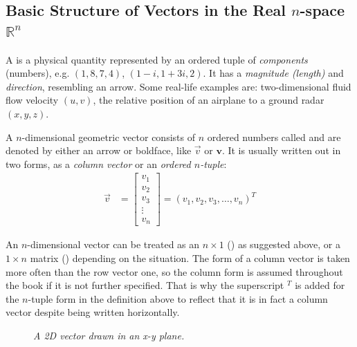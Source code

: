 \subsection{Basic Structure of Vectors in the Real $n$-space $\mathbb{R}^n$}
A  is a physical quantity represented by an ordered tuple of \textit{components} (numbers), e.g. $(1, 8, 7, 4)$, $(1-i, 1+3i, 2)$. It has a \textit{magnitude (length)} and \textit{direction}, resembling an arrow. Some real-life examples are: two-dimensional fluid flow velocity $(u, v)$, the relative position of an airplane to a ground radar $(x, y, z)$.
\begin{defn}
\label{defn:geometvec}
A $n$-dimensional geometric vector consists of $n$ ordered numbers called  and are denoted by either an arrow or boldface, like $\vec{v}$ or $\textbf{v}$. It is usually written out in two forms, as a \textit{column vector} or an \textit{ordered $n$-tuple}:
\begin{align}
\vec{v} &=
\begin{bmatrix}
v_1 \\
v_2 \\
v_3 \\
\vdots \\
v_n
\end{bmatrix}
=
(v_1, v_2, v_3, \ldots, v_n)^T
\end{align}
\end{defn}
An $n$-dimensional vector can be treated as an $n \times 1$ () as suggested above, or a $1 \times n$ matrix () depending on the situation. The form of a column vector is taken more often than the row vector one, so the column form is assumed throughout the book if it is not further specified. That is why the superscript $^T$ is added for the $n$-tuple form in the definition above to reflect that it is in fact a column vector despite being written horizontally. \par
\begin{figure}
    \centering
    \caption{\textit{A 2D vector drawn in an x-y plane.}}
\end{figure}
